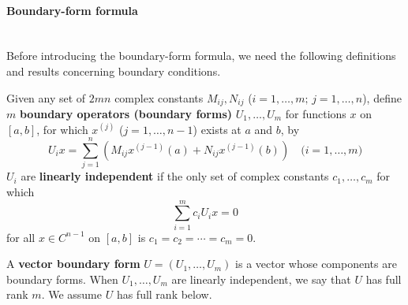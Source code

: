 \documentclass[12pt, oneside, a4paper]{article}
\begin{document}
\paragraph{Boundary-form formula}\mbox{}\\
Before introducing the boundary-form formula, we need the following definitions and results concerning boundary conditions.

\begin{defn}\cite[p.286]{CoddingtonLevinson}\label{defn:boundary form}
    Given any set of $2mn$ complex constants $M_{ij}, N_{ij}$ ($i=1,\ldots, m;\,j=1,\ldots,n$), define $m$ \textbf{boundary operators (boundary forms)} $U_1,\ldots,U_m$ for functions $x$ on $[a,b]$, for which $x^{(j)}$ ($j=1,\ldots,n-1$) exists at $a$ and $b$, by
    \begin{equation}\label{eq:U_i defn}
        U_i x = \sum_{j=1}^n (M_{ij}x^{(j-1)}(a) + N_{ij}x^{(j-1)}(b))\quad\mbox{($i=1,\ldots,m$)} 
    \end{equation}
    $U_i$ are \textbf{linearly independent} if the only set of complex constants $c_1, \ldots, c_m$ for which
    \[\sum_{i=1}^m c_i U_ix=0\]
    for all $x\in C^{n-1}$ on $[a,b]$ is $c_1=c_2=\cdots =c_m=0$.
\end{defn}

\begin{defn}\cite[p.286]{CoddingtonLevinson}\label{defn:vector boundary form}
    A \textbf{vector boundary form} $U=(U_1,\ldots,U_m)$ is a vector whose components are boundary forms. When $U_1,\ldots,U_m$ are linearly independent, we say that $U$ has full rank $m$. We assume $U$ has full rank below.
\end{defn}
\end{document}
